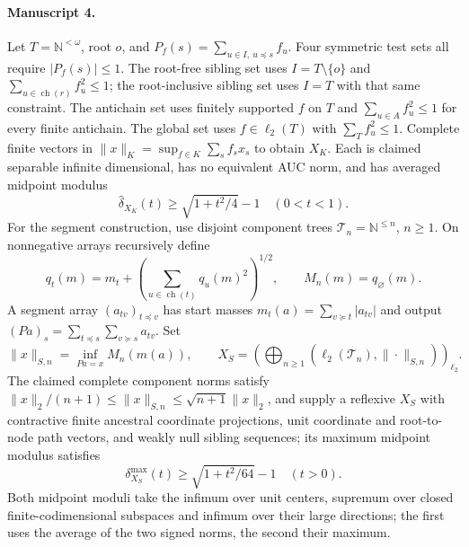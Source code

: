 \documentclass[11pt]{article}
\begin{document}
\paragraph{Manuscript 4.}
Let $T=\mathbb N^{<\omega}$, root $o$, and $P_f(s)=\sum_{u\in I,\ u\preceq s}f_u$. Four symmetric test sets all require $|P_f(s)|\le1$. The root-free sibling set uses $I=T\setminus\{o\}$ and $\sum_{u\in\operatorname{ch}(r)}f_u^2\le1$; the root-inclusive sibling set uses $I=T$ with that same constraint. The antichain set uses finitely supported $f$ on $T$ and $\sum_{u\in A}f_u^2\le1$ for every finite antichain. The global set uses $f\in\ell_2(T)$ with $\sum_Tf_u^2\le1$. Complete finite vectors in $\|x\|_K=\sup_{f\in K}\sum_s f_sx_s$ to obtain $X_K$. Each is claimed separable infinite dimensional, has no equivalent AUC norm, and has averaged midpoint modulus
\[
 \widehat\delta_{X_K}(t)\ge\sqrt{1+t^2/4}-1\quad(0<t<1).
\]
For the segment construction, use disjoint component trees $\mathcal T_n=\mathbb N^{\le n}$, $n\ge1$. On nonnegative arrays recursively define
\[
 q_t(m)=m_t+(\sum_{u\in\operatorname{ch}(t)}q_u(m)^2)^{1/2},\qquad M_n(m)=q_{\varnothing}(m).
\]
A segment array $(a_{tv})_{t\preceq v}$ has start masses $m_t(a)=\sum_{v\succeq t}|a_{tv}|$ and output $(Pa)_s=\sum_{t\preceq s}\sum_{v\succeq s}a_{tv}$. Set
\[
 \|x\|_{S,n}=\inf_{Pa=x}M_n(m(a)),\qquad
 X_S=\left(\bigoplus_{n\ge1}(\ell_2(\mathcal T_n),\|\cdot\|_{S,n})\right)_{\ell_2}.
\]
The claimed complete component norms satisfy $\|x\|_2/(n+1)\le\|x\|_{S,n}\le\sqrt{n+1}\|x\|_2$, and supply a reflexive $X_S$ with contractive finite ancestral coordinate projections, unit coordinate and root-to-node path vectors, and weakly null sibling sequences; its maximum midpoint modulus satisfies
\[
 \delta^{\max}_{X_S}(t)\ge\sqrt{1+t^2/64}-1\quad(t>0).
\]
Both midpoint moduli take the infimum over unit centers, supremum over closed finite-codimensional subspaces and infimum over their large directions; the first uses the average of the two signed norms, the second their maximum.
\end{document}
